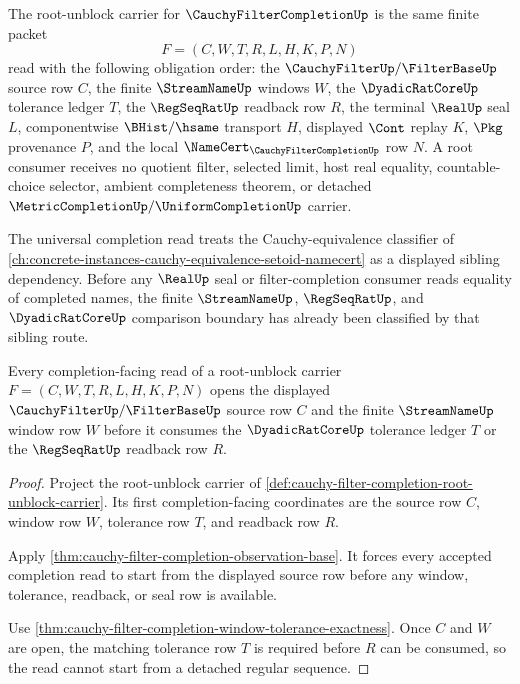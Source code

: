 \begin{definition}
\label{def:cauchy-filter-completion-root-unblock-carrier}
The root-unblock carrier for $\CauchyFilterCompletionUp$ is the same finite packet
$$
F=(C,W,T,R,L,H,K,P,N)
$$
read with the following obligation order: the $\CauchyFilterUp/\FilterBaseUp$ source row $C$, the finite $\StreamNameUp$ windows $W$, the $\DyadicRatCoreUp$ tolerance ledger $T$, the $\RegSeqRatUp$ readback row $R$, the terminal $\RealUp$ seal $L$, componentwise $\BHist/\hsame$ transport $H$, displayed $\Cont$ replay $K$, $\Pkg$ provenance $P$, and the local $\NameCert_{\CauchyFilterCompletionUp}$ row $N$. A root consumer receives no quotient filter, selected limit, host real equality, countable-choice selector, ambient completeness theorem, or detached $\MetricCompletionUp/\UniformCompletionUp$ carrier.
\end{definition}

The universal completion read treats the Cauchy-equivalence classifier of \autoref{ch:concrete-instances-cauchy-equivalence-setoid-namecert} as a displayed sibling dependency. Before any $\RealUp$ seal or filter-completion consumer reads equality of completed names, the finite $\StreamNameUp$, $\RegSeqRatUp$, and $\DyadicRatCoreUp$ comparison boundary has already been classified by that sibling route.

\begin{theorem}
\label{thm:cauchy-filter-completion-root-unblock-window}
Every completion-facing read of a root-unblock carrier $F=(C,W,T,R,L,H,K,P,N)$ opens the displayed $\CauchyFilterUp/\FilterBaseUp$ source row $C$ and the finite $\StreamNameUp$ window row $W$ before it consumes the $\DyadicRatCoreUp$ tolerance ledger $T$ or the $\RegSeqRatUp$ readback row $R$.
\end{theorem}
\begin{proof}
Project the root-unblock carrier of \autoref{def:cauchy-filter-completion-root-unblock-carrier}. Its first completion-facing coordinates are the source row $C$, window row $W$, tolerance row $T$, and readback row $R$.

Apply \autoref{thm:cauchy-filter-completion-observation-base}. It forces every accepted completion read to start from the displayed source row before any window, tolerance, readback, or seal row is available.

Use \autoref{thm:cauchy-filter-completion-window-tolerance-exactness}. Once $C$ and $W$ are open, the matching tolerance row $T$ is required before $R$ can be consumed, so the read cannot start from a detached regular sequence.
\end{proof}

